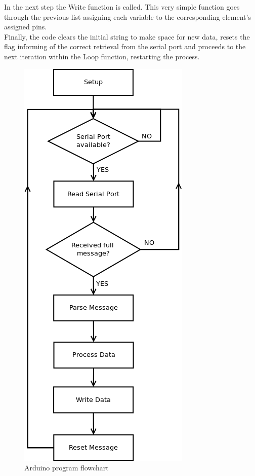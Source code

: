 In the next step the Write function is called. This very simple function goes through the previous list assigning each variable to the corresponding element's assigned pins.\\

Finally, the code clears the initial string to make space for new data, resets the flag informing of the correct retrieval from the serial port and proceeds to the next iteration within the Loop function, restarting the process.\\

	\begin{figure}[H]
			\centering
			\includegraphics[scale=0.75]{images/Diagrams/arduino2.png}
			\caption{Arduino program flowchart }
			\label{arduinoFlowchart}
	\end{figure}
	\bigskip
